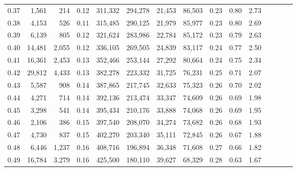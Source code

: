 \begin{tabular}{rrrcrrrrrrrrrrr}
0.37 &   1,561 &    214 &                                       0.12 &  311,332 &  294,278 &   21,453 &   86,503 &  0.23 &  0.80 &                         2.73 \\
0.38 &   4,153 &    526 &                                       0.11 &  315,485 &  290,125 &   21,979 &   85,977 &  0.23 &  0.80 &                         2.69 \\
0.39 &   6,139 &    805 &                                       0.12 &  321,624 &  283,986 &   22,784 &   85,172 &  0.23 &  0.79 &                         2.63 \\
0.40 &  14,481 &  2,055 &                                       0.12 &  336,105 &  269,505 &   24,839 &   83,117 &  0.24 &  0.77 &                         2.50 \\
0.41 &  16,361 &  2,453 &                                       0.13 &  352,466 &  253,144 &   27,292 &   80,664 &  0.24 &  0.75 &                         2.34 \\
0.42 &  29,812 &  4,433 &                                       0.13 &  382,278 &  223,332 &   31,725 &   76,231 &  0.25 &  0.71 &                         2.07 \\
0.43 &   5,587 &    908 &                                       0.14 &  387,865 &  217,745 &   32,633 &   75,323 &  0.26 &  0.70 &                         2.02 \\
0.44 &   4,271 &    714 &                                       0.14 &  392,136 &  213,474 &   33,347 &   74,609 &  0.26 &  0.69 &                         1.98 \\
0.45 &   3,298 &    541 &                                       0.14 &  395,434 &  210,176 &   33,888 &   74,068 &  0.26 &  0.69 &                         1.95 \\
0.46 &   2,106 &    386 &                                       0.15 &  397,540 &  208,070 &   34,274 &   73,682 &  0.26 &  0.68 &                         1.93 \\
0.47 &   4,730 &    837 &                                       0.15 &  402,270 &  203,340 &   35,111 &   72,845 &  0.26 &  0.67 &                         1.88 \\
0.48 &   6,446 &  1,237 &                                       0.16 &  408,716 &  196,894 &   36,348 &   71,608 &  0.27 &  0.66 &                         1.82 \\
0.49 &  16,784 &  3,279 &                                       0.16 &  425,500 &  180,110 &   39,627 &   68,329 &  0.28 &  0.63 &                         1.67 \\

\end{tabular}
